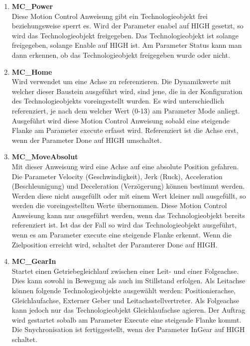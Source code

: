 \begin{enumerate}
    \item \textbf{MC\_Power} \\
        Diese Motion Control Anweisung gibt ein Technologieobjekt frei beziehungsweise sperrt es. Wird der Parameter enabel auf HIGH gesetzt, so wird das Technologieobjekt freigegeben. Das Technologieobjekt ist solange freigegeben, solange Enable auf HIGH ist. Am Parameter Status kann man dann erkennen, ob das Technologieobjekt freigegeben wurde oder nicht.

    \item \textbf{MC\_Home} \\
        Wird verwendet um eine Achse zu referenzieren. Die Dynamikwerte mit welcher dieser Baustein ausgeführt wird, sind jene, die in der Konfiguration des Technologieobjekts voreingestellt wurden. Es wird unterschiedlich referenziert, je nach dem welcher Wert (0-13) am Parameter Mode anliegt. Ausgeführt wird diese Motion Control Anweisung sobald eine steigende Flanke am Parameter execute erfasst wird. Referenziert ist die Achse erst, wenn der Parameter Done auf HIGH umschaltet. 

    \item \textbf{MC\_MoveAbsolut} \\
        Mit dieser Anweisung wird eine Achse auf eine absolute Position gefahren. Die Parameter Velocity (Geschwindigkeit), Jerk (Ruck), Acceleration (Beschleunigung) und Deceleration (Verzögerung) können bestimmt werden. Werden diese nicht ausgefüllt oder mit einem Wert kleiner null ausgefüllt, so werden die voreingestellten Werte übernommen. Diese Motion Control Anweisung kann nur ausgeführt werden, wenn das Technologieobjekt bereits referenziert ist. Ist das der Fall so wird das Technologieobjekt ausgeführt, wenn es am Parameter execute eine steigende Flanke erkennt. Wenn die Zielposition erreicht wird, schaltet der Paramterer Done auf HIGH. 

    \item \textbf{MC\_GearIn} \\
        Startet einen Getriebegleichlauf zwischen einer Leit- und einer Folgeachse. Dies kann sowohl in Bewegung als auch im Stillstand erfolgen. Als Leitachse können folgende Technologieobjekte ausgewählt werden: Positionierachse, Gleichlaufachse, Externer Geber und Leitachsstellvertreter. Als Folgeachse kann jedoch nur das Technologieobjekt Gleichlaufachse agieren. Der Auftrag wird gestartet sobalb am Parameter Execute eine steigende Flanke kommt. Die Snychronisation ist fertiggestellt, wenn der Parameter InGear auf HIGH schaltet.

\end{enumerate}

